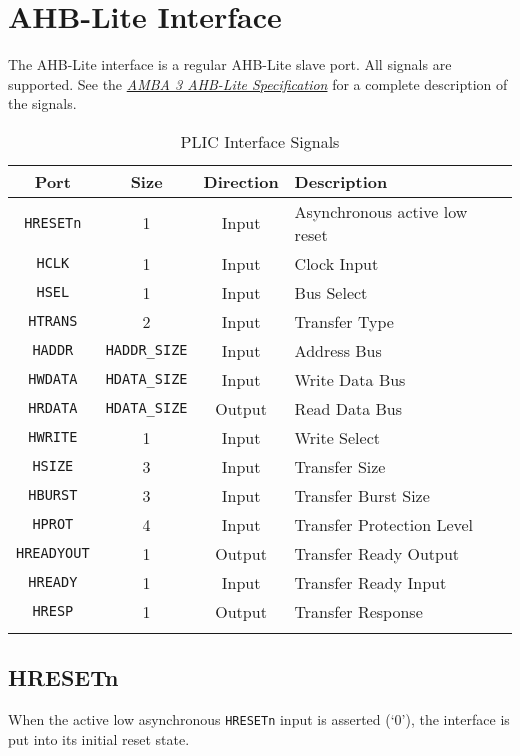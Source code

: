 \section{AHB-Lite Interface}

The AHB-Lite interface is a regular AHB-Lite slave port. All signals are
supported. See the
\emph{\href{https://www.arm.com/products/system-ip/amba-specifications}{AMBA
		3 AHB-Lite Specification}} for a complete description of the signals.

\begin{longtable}[c]{@{\extracolsep{\fill}}cccl@{}}	
	\toprule 
	\textbf{Port} & \textbf{Size} & \textbf{Direction} & \textbf{Description}\\
	\midrule
	\endhead 
	\texttt{HRESETn}   & 1 & Input  & Asynchronous active low reset\\
	\texttt{HCLK}      & 1 & Input  & Clock Input\\
	\texttt{HSEL}      & 1 & Input  & Bus Select\\
	\texttt{HTRANS}    & 2 & Input  & Transfer Type\\
	\texttt{HADDR}     & \texttt{HADDR\_SIZE} & Input & Address Bus\\
	\texttt{HWDATA}    & \texttt{HDATA\_SIZE} & Input & Write Data Bus\\
	\texttt{HRDATA}    & \texttt{HDATA\_SIZE} & Output & Read Data Bus\\
	\texttt{HWRITE}    & 1 & Input  & Write Select\\
	\texttt{HSIZE}     & 3 & Input  & Transfer Size\\
	\texttt{HBURST}    & 3 & Input  & Transfer Burst Size\\
	\texttt{HPROT}     & 4 & Input  & Transfer Protection Level\\
	\texttt{HREADYOUT} & 1 & Output & Transfer Ready Output\\
	\texttt{HREADY}    & 1 & Input  & Transfer Ready Input\\
	\texttt{HRESP}     & 1 & Output & Transfer Response\\
	\bottomrule 	
	\caption{PLIC Interface Signals}
	\label{tab:AHBIF}
\end{longtable}

\subsection{HRESETn}

When the active low asynchronous \texttt{HRESETn} input is asserted
(`0'), the interface is put into its initial reset state.

